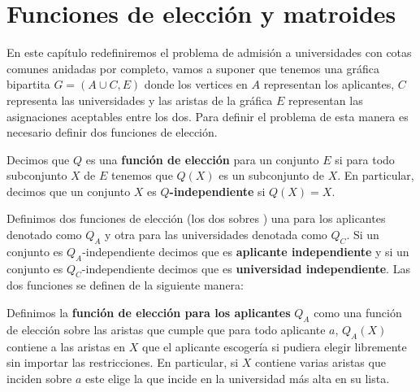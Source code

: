 \chapter{Funciones de elección y matroides}

En este capítulo redefiniremos el problema de admisión a universidades con cotas comunes anidadas por completo, vamos a suponer que tenemos una gráfica bipartita $G=(A\cup C,E)$ donde los vertices en $A$ representan los aplicantes, $C$ representa las universidades y las aristas de la gráfica $E$ representan las asignaciones aceptables entre los dos. Para definir el problema de esta manera es necesario definir dos funciones de elección. 

\begin{dfn}
Decimos que $Q$ es una \textbf{función de elección} para un conjunto $E$ si para todo subconjunto $X$ de $E$ tenemos que $Q(X)$ es un subconjunto de $X$. En particular, decimos que un conjunto $X$ es \textbf{$Q$-independiente} si $Q(X)=X$.
\end{dfn}

Definimos dos funciones de elección (los dos sobres ) una para los aplicantes denotado como $Q_A$ y otra para las universidades denotada como $Q_C$. Si un conjunto es $Q_A$-independiente decimos que es \textbf{aplicante independiente} y si un conjunto es $Q_C$-independiente decimos que es \textbf{universidad independiente}. Las dos funciones se definen de la siguiente manera:

\begin{dfn}
Definimos la \textbf{función de elección para los aplicantes} $Q_A$ como una función de elección sobre las aristas que cumple que para todo aplicante $a$, $Q_A(X)$ contiene a las aristas en $X$ que el aplicante escogería si pudiera elegir libremente sin importar las restricciones. En particular, si $X$ contiene varias aristas que inciden sobre $a$ este elige la que incide en la universidad más alta en su lista. 
\end{dfn} 

